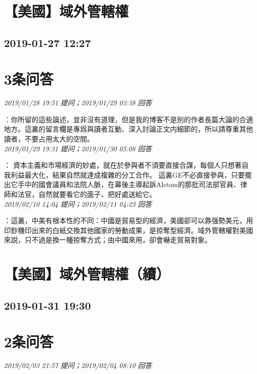\documentclass[twocolumn]{ctexart}
\begin{document}
\section{【美國】域外管轄權}
\subsection{2019-01-27 12:27}


\section{3条问答}

\textit{\hfill\noindent\small 2019/01/28 19:51 提问；2019/01/29 03:38 回答}

：你所留的這些論述，並非沒有道理，但是我的博客不是別的作者長篇大論的合適地方。這裏的留言欄是專爲與讀者互動、深入討論正文内細節的，所以請尊重其他讀者，不要占用太大的空間。
\\

\textit{\hfill\noindent\small 2019/01/29 19:31 提问；2019/01/30 05:08 回答}

：
資本主義和市場經濟的妙處，就在於參與者不須要直接合謀，每個人只想著自我利益最大化，結果自然就達成複雜的分工合作。
這裏GE不必直接參與，只要擺出它手中的國會議員和法院人脈，在幕後主導起訴Alstom的那批司法部官員、律師和法官，自然就要看它的面子、把好處送給它。
\\

\textit{\hfill\noindent\small 2019/02/10 14:04 提问；2019/02/11 04:23 回答}

：這裏，中美有根本性的不同：中國是貿易型的經濟，美國卻可以靠强勢美元，用印鈔機印出來的白紙交換其他國家的勞動成果，是掠奪型經濟。域外管轄權對美國來説，只不過是換一種掠奪方式；由中國來用，卻會嚇走貿易對象。
\\


\section{【美國】域外管轄權（續）}
\subsection{2019-01-31 19:30}


\section{2条问答}

\textit{\hfill\noindent\small 2019/02/03 21:57 提问；2019/02/04 08:10 回答}
\end{document}
